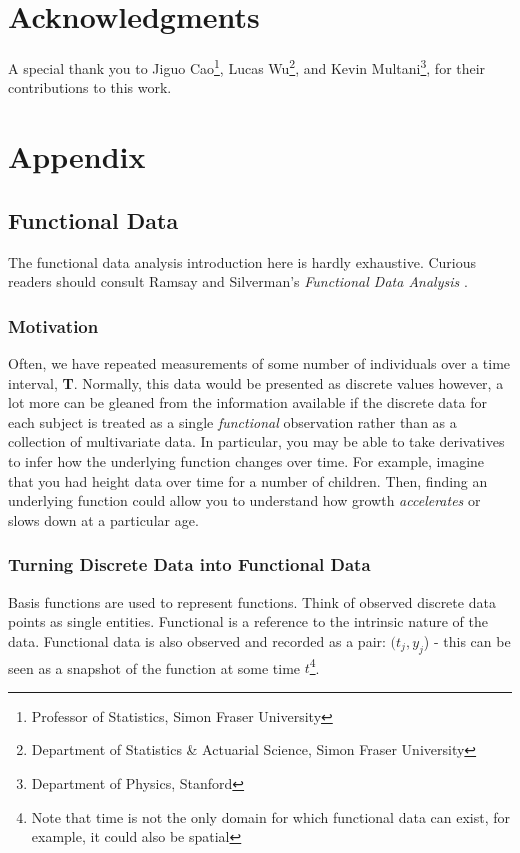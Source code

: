 \documentclass{article}
\begin{document}
\section{Acknowledgments}
\label{section:zero}
\noindent A special thank you to Jiguo Cao\footnote{Professor of Statistics, Simon Fraser University}, Lucas Wu\footnote{Department of Statistics \& Actuarial Science, Simon Fraser University}, and Kevin Multani\footnote{Department of Physics, Stanford},  for their contributions to this work.

\newpage
\section{Appendix}
\label{sec:appendix}
\subsection{Functional Data}
\label{sec:functionaldata}

\noindent The functional data analysis introduction here is hardly exhaustive. Curious readers should consult Ramsay and Silverman's \textit{Functional Data Analysis} \cite{fda}.

\subsubsection{Motivation}

\noindent Often, we have repeated measurements of some number of individuals over a time interval, \textbf{T}. Normally, this data would be presented as discrete values however, a lot more can be gleaned from the information available if the discrete data for each subject is treated as a single \textit{functional} observation rather than as a collection of multivariate data. In particular, you may be able to take derivatives to infer how the underlying function changes over time. For example, imagine that you had height data over time for a number of children. Then, finding an underlying function could allow you to understand how growth \textit{accelerates} or slows down at a particular age. 


\subsubsection{Turning Discrete Data into Functional Data}

\noindent Basis functions are used to represent functions. Think of observed discrete data points as single entities. Functional is a reference to the intrinsic nature of the data. Functional data is also observed and recorded as a pair: $(t_j, y_j$) - this can be seen as a snapshot of the function at some time $t$\footnote{Note that time is not the only domain for which functional data can exist, for example, it could also be spatial}. 
\end{document}
